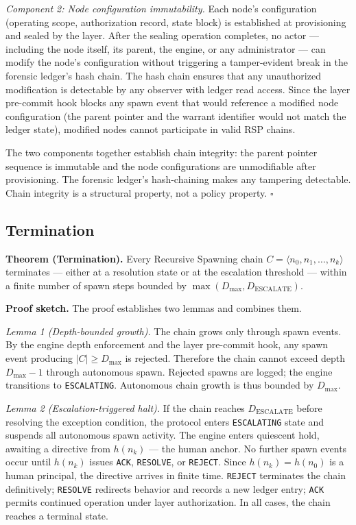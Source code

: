 \medskip
\textit{Component 2: Node configuration immutability.} Each node's configuration (operating scope, authorization record, state block) is established at provisioning and sealed by the \fact{} layer. After the sealing operation completes, no actor --- including the node itself, its parent, the \bounds{} engine, or any administrator --- can modify the node's configuration without triggering a tamper-evident break in the forensic ledger's hash chain. The hash chain ensures that any unauthorized modification is detectable by any observer with ledger read access. Since the \fact{} layer pre-commit hook blocks any spawn event that would reference a modified node configuration (the parent pointer and the warrant identifier would not match the ledger state), modified nodes cannot participate in valid RSP chains.

The two components together establish chain integrity: the parent pointer sequence is immutable and the node configurations are unmodifiable after provisioning. The forensic ledger's hash-chaining makes any tampering detectable. Chain integrity is a structural property, not a policy property. $\square$

\subsection{Termination}
\label{sec:rs-termination}

\medskip
\noindent\textbf{Theorem (Termination).} Every Recursive Spawning chain $C = \langle n_0, n_1, \ldots, n_k \rangle$ terminates --- either at a resolution state or at the escalation threshold --- within a finite number of spawn steps bounded by $\max(D_{\mathrm{max}}, D_{\mathrm{ESCALATE}})$.

\medskip
\noindent\textbf{Proof sketch.} The proof establishes two lemmas and combines them.

\medskip
\textit{Lemma 1 (Depth-bounded growth).} The chain grows only through spawn events. By the \bounds{} engine depth enforcement and the \fact{} layer pre-commit hook, any spawn event producing $|C| \geq D_{\mathrm{max}}$ is rejected. Therefore the chain cannot exceed depth $D_{\mathrm{max}} - 1$ through autonomous spawn. Rejected spawns are logged; the \bounds{} engine transitions to \texttt{ESCALATING}. Autonomous chain growth is thus bounded by $D_{\mathrm{max}}$.

\medskip
\textit{Lemma 2 (Escalation-triggered halt).} If the chain reaches $D_{\mathrm{ESCALATE}}$ before resolving the exception condition, the protocol enters \texttt{ESCALATING} state and suspends all autonomous spawn activity. The \bounds{} engine enters quiescent hold, awaiting a directive from $h(n_k)$ --- the human anchor. No further spawn events occur until $h(n_k)$ issues \texttt{ACK}, \texttt{RESOLVE}, or \texttt{REJECT}. Since $h(n_k) = h(n_0)$ is a human principal, the directive arrives in finite time. \texttt{REJECT} terminates the chain definitively; \texttt{RESOLVE} redirects behavior and records a new ledger entry; \texttt{ACK} permits continued operation under \purpose{} layer authorization. In all cases, the chain reaches a terminal state.

